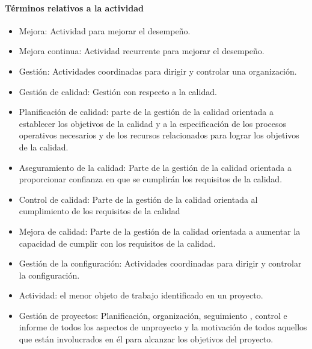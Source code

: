 		\paragraph{Términos relativos a la actividad}
			\begin{itemize}
				\item Mejora: Actividad para mejorar el desempeño.
				
				\item Mejora continua: Actividad recurrente para mejorar el desempeño.
				
				\item Gestión: Actividades coordinadas para dirigir y controlar una organización.
				
				\item Gestión de calidad: Gestión con respecto a la calidad.
				
				\item Planificación de calidad: parte de la gestión de la calidad orientada a establecer los objetivos de la calidad y a la
				especificación de los procesos operativos necesarios y de los recursos relacionados para lograr
				los objetivos de la calidad.
				
				\item Aseguramiento de la calidad: Parte de la gestión de la calidad orientada a proporcionar confianza en que se cumplirán los
				requisitos de la calidad.
				
				\item Control de calidad: Parte de la gestión de la calidad orientada al cumplimiento de los requisitos de la calidad
				
				\item Mejora de calidad: Parte de la gestión de la calidad orientada a aumentar la capacidad de cumplir con los
				requisitos de la calidad.
				
				\item Gestión de la configuración: Actividades coordinadas para dirigir y controlar la configuración.
				
				\item Actividad: el menor objeto de trabajo identificado en un proyecto. 
				
				\item Gestión de proyectos: Planificación, organización, seguimiento , control e informe de todos los aspectos de unproyecto y la motivación de todos aquellos que están involucrados en él para alcanzar los objetivos del proyecto.
				
			\end{itemize}
		
